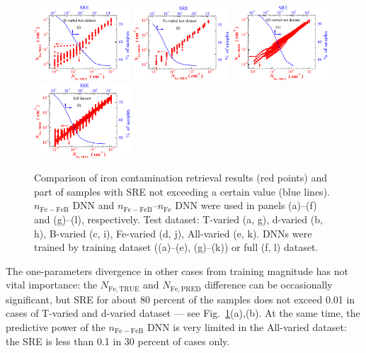 \documentclass[journal]{IEEEtran}
\begin{document}
\begin{figure}[tb]
\includegraphics[width=0.32\textwidth]{Fig22d}
\includegraphics[width=0.32\textwidth]{Fig22e}
\includegraphics[width=0.32\textwidth]{Fig22f}
\includegraphics[width=0.32\textwidth]{Fig22g}
\caption{Comparison of iron contamination retrieval results (red points)
and part of samples with SRE not exceeding a certain value (blue lines).
$n_\mathrm{Fe-FeB}$ DNN and $n_\mathrm{Fe-FeB}$--$n_\mathrm{Fe}$ DNN were used
in panels (a)--(f) and (g)--(l), respectively.
Test dataset: T-varied (a, g),
d-varied (b, h),
B-varied (c, i),
Fe-varied (d, j),
All-varied (e, k).
DNNs were trained by training dataset ((a)--(e), (g)--(k))
or full (f, l) dataset.
}
\label{fig_TrPr}
\end{figure}

The one-parameters divergence in other cases from training magnitude has not vital importance:
the $N_\mathrm{Fe,TRUE}$ and $N_\mathrm{Fe,PRED}$ difference can be occasionally significant,
but SRE for about 80 percent of the samples does not exceed 0.01 in cases of T-varied and d-varied dataset --- see Fig.~\ref{fig_TrPr}(a),(b).
At the same time, the predictive power of the $n_\mathrm{Fe-FeB}$ DNN is very limited in the All-varied dataset:
the SRE is less than 0.1 in 30 percent of cases only.
\end{document}
